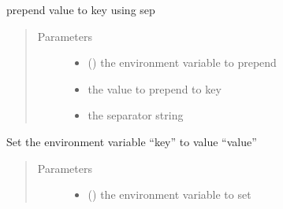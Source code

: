 \documentclass[a4paper,10pt,english]{sphinxmanual}
\begin{document}
\begin{fulllineitems}
\begin{fulllineitems}
\begin{quote}
\begin{description}
\begin{itemize}
\end{itemize}

\end{description}\end{quote}

\end{fulllineitems}


\begin{fulllineitems}
\label{\detokenize{commands/apidoc/src:src.environment.Environ.prepend_value}}
prepend value to key using sep
\begin{quote}\begin{description}
\item[{Parameters}] \leavevmode\begin{itemize}
\item {} 
 () \textendash{} the environment variable to prepend

\item {} 
 \textendash{} the value to prepend to key

\item {} 
 \textendash{} the separator string

\end{itemize}

\end{description}\end{quote}

\end{fulllineitems}


\begin{fulllineitems}
\label{\detokenize{commands/apidoc/src:src.environment.Environ.set}}
Set the environment variable “key” to value “value”
\begin{quote}\begin{description}
\item[{Parameters}] \leavevmode\begin{itemize}
\item {} 
 () \textendash{} the environment variable to set


\end{itemize}
\end{description}
\end{quote}
\end{fulllineitems}
\end{fulllineitems}
\end{document}
